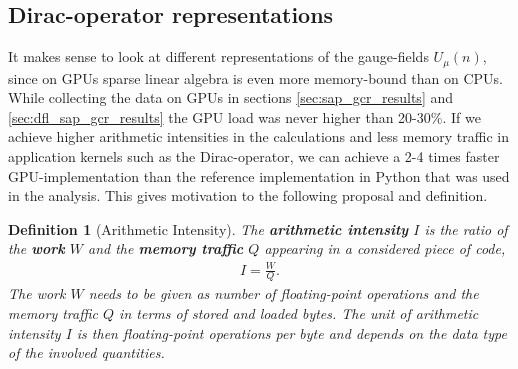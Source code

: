 \documentclass{article}
\theoremstyle{plain} %
\newtheorem{definition}{Definition}[section]
\theoremstyle{convention} %
\theoremstyle{remark} %
\def\df#1{\textbf{\textit{#1}}}
\numberwithin{equation}{section}
\begin{document}

\subsection{Dirac-operator representations}

It makes sense to look at different representations of the gauge-fields $U_{\mu}(n)$, since on GPUs sparse linear algebra is even more memory-bound than on CPUs. While collecting the data on GPUs in sections \ref{sec:sap_gcr_results} and \ref{sec:dfl_sap_gcr_results} the GPU load was never higher than \num{20}-\num{30}\%. If we achieve higher arithmetic intensities in the calculations and less memory traffic in application kernels such as the Dirac-operator, we can achieve a \num{2}-\num{4} times faster GPU-implementation than the reference implementation in Python that was used in the analysis. This gives motivation to the following proposal and definition.

\begin{definition}[Arithmetic Intensity]
  The \df{arithmetic intensity} $I$ is the ratio of the \df{work} $W$ and the \df{memory traffic} $Q$ appearing in a considered piece of code,
  \begin{align*}
    I = \frac{W}{Q}.
  \end{align*}
  The work $W$ needs to be given as number of floating-point operations and the memory traffic $Q$ in terms of stored and loaded bytes. The unit of arithmetic intensity $I$ is then floating-point operations per byte and depends on the data type of the involved quantities.
\end{definition}
\end{document}
